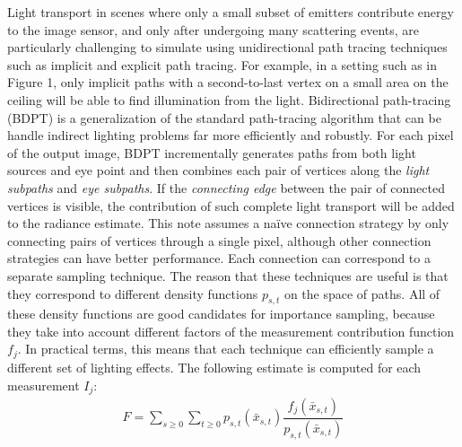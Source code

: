  Light transport in scenes where only a small subset of emitters contribute energy to the image sensor, and only after undergoing many scattering events, are particularly challenging to simulate using unidirectional path tracing techniques such as implicit and explicit path tracing. For example, in a setting such as in Figure 1, only implicit paths with a second-to-last vertex on a small area on the ceiling will be able to find illumination from the light. 
%
\newline
%
Bidirectional path-tracing (BDPT) is a generalization of the standard path-tracing algorithm that can be handle indirect lighting problems far more efficiently and robustly. For each pixel of the output image, BDPT incrementally generates paths from both light sources and eye point and then combines each pair of vertices along the \textit{light subpaths} and \textit{eye subpaths}. If the \textit{connecting edge} between the pair of connected vertices is visible, the contribution of such complete light transport will be added to the radiance estimate. This note assumes a naïve connection strategy by only connecting pairs of vertices through a single pixel, although other connection strategies can have better performance.
%
\newline
%
Each connection can correspond to a separate sampling technique. The  reason that these techniques are useful is that they correspond to different density functions $p_{s,t}$ on the space of paths. All of these density functions are good candidates for importance sampling, because they take into account different factors of the measurement contribution function $f_{j}$. In practical terms, this means that each
technique can efficiently sample a different set of lighting effects.
%
\newline
%
The following estimate is computed for each measurement $I_{j}$:
%
\begin{align}
\label{eqn:measurementEquation}
F = \sum_{s\geq0}\sum_{t\geq0}p_{s,t}(\bar{x}_{s,t}) \dfrac{f_{j}(\bar{x}_{s,t})}{p_{s,t}(\bar{x}_{s,t})}
\end{align}
	
%	
	

